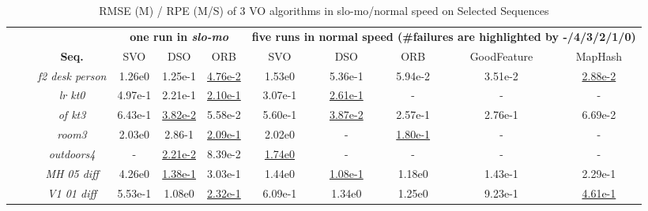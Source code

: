 \begin{table}[t]
	\small
	\centering
	\caption{RMSE (M) / RPE (M/S) of 3 VO algorithms in slo-mo/normal speed on Selected Sequences}
	\begin{tabular}{c|c||c|c|c||c|c|c|c|c}
		\toprule[1pt]
		\midrule[0.1pt]
		\textbf{ } & 
		& \multicolumn{3}{c||}{\bfseries \small one run in \textit{slo-mo}}
		& \multicolumn{5}{c}{\bfseries \small five runs in normal speed (\#failures are highlighted by -/\textcolor{f4}{4}/\textcolor{f3}{3}/\textcolor{f2}{2}/\textcolor{f1}{1}/0)} \\
		\cmidrule{3-10}
		& \textbf{\small Seq.} & SVO\cite{SVO2017} & DSO\cite{DSO2017} & ORB\cite{ORBSLAM}  & SVO\cite{SVO2017} & DSO\cite{DSO2017} & ORB\cite{ORBSLAM} & GoodFeature\cite{zhao2018good2} & MapHash\cite{zhao2019maphash} \\
		\midrule
		\  \parbox[t]{1mm}{} \ 
				
		& \textit{f2 desk person}  & 1.26e0 	& 1.25e-1	& \underline{4.76e-2}  & \textcolor{f1}{1.53e0}& \textcolor{f0}{5.36e-1}& \textcolor{f0}{5.94e-2} & \textcolor{f0}{3.51e-2} &  \underline{\textcolor{f0}{2.88e-2}}\\
		
		& \textit{lr kt0}			& 4.97e-1	& 2.21e-1	&	\underline{2.10e-1}	 & \textcolor{f0}{3.07e-1} & \underline{\textcolor{f0}{2.61e-1}} & - & - & -			\\		
		
		& \textit{of kt3}			& 6.43e-1	& \underline{3.82e-2}	&	5.58e-2		 &\textcolor{f0}{5.60e-1} & \underline{\textcolor{f0}{3.87e-2}}&\textcolor{f0}{2.57e-1} & \textcolor{f0}{2.76e-1} & 	 \textcolor{f0}{6.69e-2}	\\
		
		& \textit{room3}  			& 2.03e0	& 2.86-1	& \underline{2.09e-1}  & \textcolor{f2}{2.02e0}& - & \underline{\textcolor{f2}{1.80e-1}} & -&  -\\ 		
		
		& \textit{outdoors4}  		& -		 	& \underline{2.21e-2} 	& 8.39e-2  & \underline{\textcolor{f3}{1.74e0}}& - & - & -&  -\\ 
				
		& \textit{MH 05 diff}  		& 4.26e0 	& \underline{1.38e-1}	& 3.03e-1 &  \textcolor{f1}{1.44e0} & \underline{\textcolor{f4}{1.08e-1}}& \textcolor{f0}{1.18e0} & \textcolor{f0}{1.43e-1} & \textcolor{f0}{2.29e-1}\\ 
		
		& \textit{V1 01 diff}  		& 5.53e-1 	& 1.08e0 	& \underline{2.32e-1}  & \textcolor{f0}{6.09e-1} & \textcolor{f0}{1.34e0}& \textcolor{f3}{1.25e0}& \textcolor{f4}{9.23e-1}&  \underline{\textcolor{f2}{4.61e-1}}\\ 
		

\end{tabular}
\end{table}
